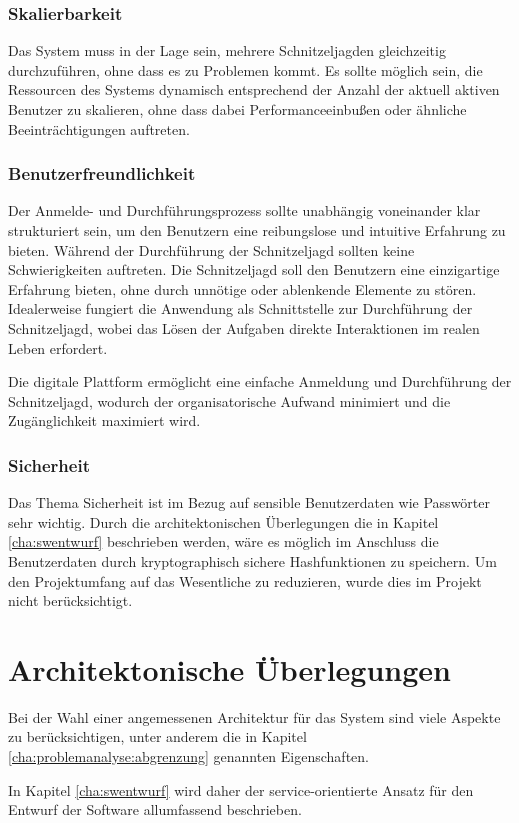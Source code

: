 \subsubsection{Skalierbarkeit}

Das System muss in der Lage sein, mehrere Schnitzeljagden gleichzeitig durchzuführen, ohne dass es zu Problemen kommt. Es sollte möglich sein, die Ressourcen des Systems dynamisch entsprechend der Anzahl der aktuell aktiven Benutzer zu skalieren, ohne dass dabei Performanceeinbußen oder ähnliche Beeinträchtigungen auftreten.

\subsubsection{Benutzerfreundlichkeit}

Der Anmelde- und Durchführungsprozess sollte unabhängig voneinander klar strukturiert sein, um den Benutzern eine reibungslose und intuitive Erfahrung zu bieten. Während der Durchführung der Schnitzeljagd sollten keine Schwierigkeiten auftreten. Die Schnitzeljagd soll den Benutzern eine einzigartige Erfahrung bieten, ohne durch unnötige oder ablenkende Elemente zu stören. Idealerweise fungiert die Anwendung als Schnittstelle zur Durchführung der Schnitzeljagd, wobei das Lösen der Aufgaben direkte Interaktionen im realen Leben erfordert.

Die digitale Plattform ermöglicht eine einfache Anmeldung und Durchführung der Schnitzeljagd, wodurch der organisatorische Aufwand minimiert und die Zugänglichkeit maximiert wird.

\subsubsection{Sicherheit}

Das Thema Sicherheit ist im Bezug auf sensible Benutzerdaten wie Passwörter sehr wichtig. Durch die architektonischen Überlegungen die in Kapitel \ref{cha:swentwurf} beschrieben werden, wäre es möglich im Anschluss die Benutzerdaten durch kryptographisch sichere Hashfunktionen zu speichern. Um den Projektumfang auf das Wesentliche zu reduzieren, wurde dies im Projekt nicht berücksichtigt.

\section{Architektonische Überlegungen}

Bei der Wahl einer angemessenen Architektur für das System sind viele Aspekte zu berücksichtigen, unter anderem die in Kapitel \ref{cha:problemanalyse:abgrenzung} genannten Eigenschaften.

In Kapitel \ref{cha:swentwurf} wird daher der service-orientierte Ansatz für den Entwurf der Software allumfassend beschrieben.
